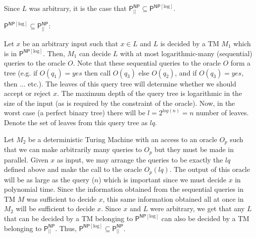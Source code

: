 \begin{question}
\begin{answer}
        Since $L$ was arbitrary, it is the case that $\mathsf{P}_{||}^{\mathsf{NP}} \subseteq \mathsf{P}^{\mathsf{NP}[\text{log}]}$.

        \vspace{1em}

        $\mathsf{P}^{\mathsf{NP}[\text{log}]} \subseteq   \mathsf{P}_{||}^{\mathsf{NP}}:$

        \par Let $x$ be an arbitrary input such that $x \in L$ and $L$ is decided by a TM $M_1$ which is in $\mathsf{P}^{\mathsf{NP}[\text{log}]}$. Then, $M_1$ can decide $L$ with at most logarithmic-many (sequential) queries to the oracle $O$. Note that these sequential queries to the oracle $O$ form a tree (e.g. if $O(q_1) = yes$ then call $O(q_3)$ else $O(q_2)$, and if $O(q_3) = yes$, then ... etc.). The leaves of this query tree will determine whether we should accept or reject $x$. The maximum depth of the query tree is logarithmic in the size of the input (as is required by the constraint of the oracle). Now, in the worst case (a perfect binary tree) there will be $l = 2^{log(n)} = n$ number of leaves. Denote the set of leaves from this query tree as $lq$.
        \par Let $M_2$ be a deterministic Turing Machine with an access to an oracle $O_p$ such that we can make arbitrarily many queries to $O_p$ but they must be made in parallel. Given $x$ as input, we may arrange the queries to be exactly the $lq$ defined above and make the call to the oracle $O_p(lq)$. The output of this oracle will be as large as the query ($n$) which is important since we must decide $x$ in polynomial time. Since the information obtained from the sequential queries in TM $M$ was sufficient to decide $x$, this same information obtained all at once in $M_2$ will be sufficient to decide $x$. Since $x$ and $L$ were arbitrary, we get that any $L$ that can be decided by a TM belonging to $\mathsf{P}^{\mathsf{NP}[\text{log}]}$ can also be decided by a TM belonging to $\mathsf{P}_{||}^{\mathsf{NP}}$. Thus, $\mathsf{P}^{\mathsf{NP}[\text{log}]} \subseteq   \mathsf{P}_{||}^{\mathsf{NP}}$.
    \end{answer}
\end{question}

